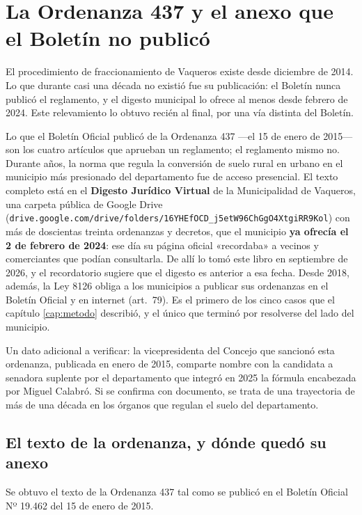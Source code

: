 \section{La Ordenanza 437 y el anexo que el Boletín no publicó}

El procedimiento de fraccionamiento de Vaqueros existe desde diciembre de 2014. Lo que durante casi una década no existió fue su publicación: el Boletín nunca publicó el reglamento, y el digesto municipal lo ofrece al menos desde febrero de 2024. Este relevamiento lo obtuvo recién al final, por una vía distinta del Boletín.

\begin{cautela}
Lo que el Boletín Oficial publicó de la Ordenanza 437 ---el 15 de enero de 2015--- son los cuatro artículos que aprueban un reglamento; el reglamento mismo no. Durante años, la norma que regula la conversión de suelo rural en urbano en el municipio más presionado del departamento fue de acceso presencial. El texto completo está en el \textbf{Digesto Jurídico Virtual} de la Municipalidad de Vaqueros, una carpeta pública de Google Drive (\texttt{drive.google.com/drive/folders/16YHEfOCD\_j5etW96ChGgO4XtgiRR9Kol}) con más de doscientas treinta ordenanzas y decretos, que el municipio \textbf{ya ofrecía el 2 de febrero de 2024}: ese día su página oficial «recordaba» a vecinos y comerciantes que podían consultarla. De allí lo tomó este libro en septiembre de 2026, y el recordatorio sugiere que el digesto es anterior a esa fecha. Desde 2018, además, la Ley 8126 obliga a los municipios a publicar sus ordenanzas en el Boletín Oficial y en internet (art.\ 79). Es el primero de los cinco casos que el capítulo \ref{cap:metodo} describió, y el único que terminó por resolverse del lado del municipio.

Un dato adicional a verificar: la vicepresidenta del Concejo que sancionó esta ordenanza, publicada en enero de 2015, comparte nombre con la candidata a senadora suplente por el departamento que integró en 2025 la fórmula encabezada por Miguel Calabró. Si se confirma con documento, se trata de una trayectoria de más de una década en los órganos que regulan el suelo del departamento.
\end{cautela}

\subsection*{El texto de la ordenanza, y dónde quedó su anexo}

Se obtuvo el texto de la Ordenanza 437 tal como se publicó en el Boletín Oficial Nº 19.462 del 15 de enero de 2015.

